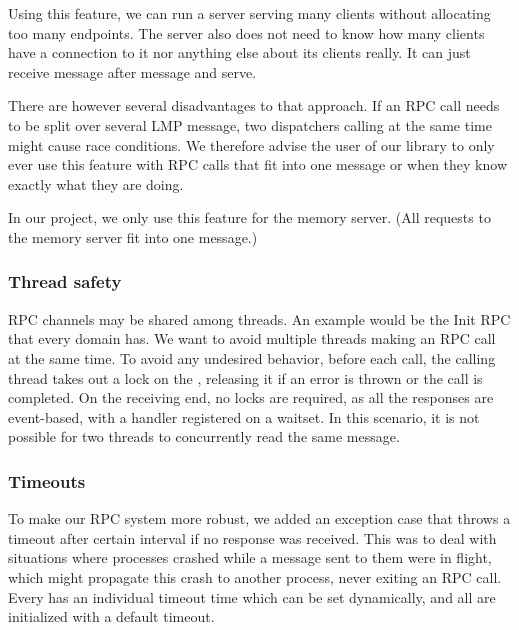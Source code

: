 Using this feature, we can run a server serving many clients without allocating too many
endpoints. The server also does not need to know how many clients have a connection to
it nor anything else about its clients really. It can just receive message after message
and serve.

There are however several disadvantages to that approach. If an RPC call needs to be split
over several LMP message, two dispatchers calling at the same time might cause race conditions.
We therefore advise the user of our library to only ever use this feature with
RPC calls that fit into one message or when they know exactly what they are doing.

In our project, we only use this feature for the memory server. (All requests to the
memory server fit into one message.)


\subsubsection{Thread safety}
RPC channels may be shared among threads. An example would be the Init RPC that every domain has. We want to avoid multiple threads making an RPC call at the same time. To avoid any undesired behavior, before each call, the calling thread takes out a lock on the , releasing it if an error is thrown or the call is completed. On the receiving end, no locks are required, as all the responses are event-based, with a handler registered on a waitset. In this scenario, it is not possible for two threads to concurrently read the same message.


\subsubsection{Timeouts}
To make our RPC system more robust, we added an exception case that throws a timeout after certain interval if no response was received. This was to deal with situations where processes crashed while a message sent to them were in flight, which might propagate this crash to another process, never exiting an RPC call. Every  has an individual timeout time which can be set dynamically, and all are initialized with a default timeout. 

